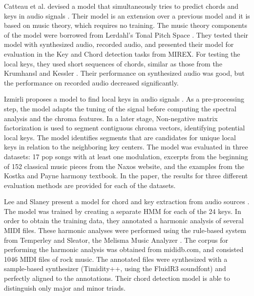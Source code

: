 Catteau et al. devised a model that simultaneously tries to predict chords and keys in audio signals \cite{catteau2007probabilistic}. Their model is an extension over a previous model \cite{bello2005robust} and it is based on music theory, which requires no training. The music theory components of the model were borrowed from Lerdahl's Tonal Pitch Space \cite{lerdahl2005tonal}. They tested their model with synthesized audio, recorded audio, and presented their model for evaluation in the Key and Chord detection tasks from MIREX. For testing the local keys, they used short sequences of chords, similar as those from the Krumhansl and Kessler \cite{krumhansl1982tracing}. Their performance on synthesized audio was good, but the performance on recorded audio decreased significantly.


Izmirli proposes a model to find local keys in audio signals \cite{izmirli2007localized}. As a pre-processing step, the model adapts the tuning of the signal before computing the spectral analysis and the chroma features. In a later stage, Non-negative matrix factorization is used to segment contiguous chroma vectors, identifying potential local keys. The model identifies segments that are candidates for unique local keys in relation to the neighboring key centers. The model was evaluated in three datasets: 17 pop songs with at least one modulation, excerpts from the beginning of 152 classical music pieces from the Naxos website, and the examples from the Kostka and Payne harmony textbook. In the paper, the results for three different evaluation methods are provided for each of the datasets.

Lee and Slaney present a model for chord and key extraction from audio sources \cite{lee2007unified}. The model was trained by creating a separate HMM for each of the 24 keys. In order to obtain the training data, they annotated a harmonic analysis of several MIDI files. These harmonic analyses were performed using the rule-based system from Temperley and Sleator, the Melisma Music Analyzer \cite{temperley2004cognition}. The corpus for performing the harmonic analysis was obtained from mididb.com, and consisted 1046 MIDI files of rock music. The annotated files were synthesized with a sample-based synthesizer (Timidity++, using the FluidR3 soundfont) and perfectly aligned to the annotations. Their chord detection model is able to distinguish only major and minor triads.

